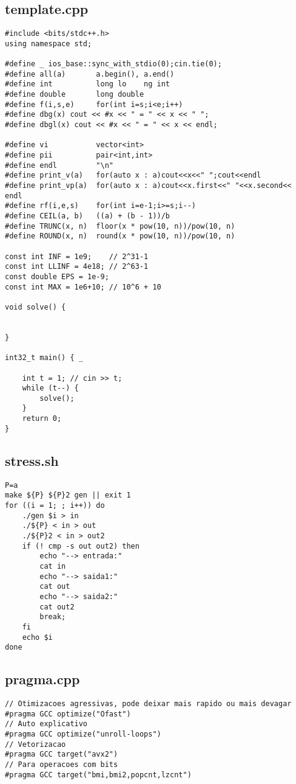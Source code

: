 \documentclass[11pt, a4paper, twoside]{article}
\begin{document}
\subsection{template.cpp}
\begin{lstlisting}
#include <bits/stdc++.h>
using namespace std;

#define _ ios_base::sync_with_stdio(0);cin.tie(0);
#define all(a)       a.begin(), a.end()
#define int          long lo	ng int
#define double       long double
#define f(i,s,e) 	 for(int i=s;i<e;i++)
#define dbg(x) cout << #x << " = " << x << " ";
#define dbgl(x) cout << #x << " = " << x << endl;

#define vi 			 vector<int>
#define pii	         pair<int,int>
#define endl         "\n"
#define print_v(a)   for(auto x : a)cout<<x<<" ";cout<<endl
#define print_vp(a)  for(auto x : a)cout<<x.first<<" "<<x.second<< endl
#define rf(i,e,s) 	 for(int i=e-1;i>=s;i--)
#define CEIL(a, b)   ((a) + (b - 1))/b
#define TRUNC(x, n)  floor(x * pow(10, n))/pow(10, n)
#define ROUND(x, n)  round(x * pow(10, n))/pow(10, n)

const int INF = 1e9;    // 2^31-1
const int LLINF = 4e18; // 2^63-1
const double EPS = 1e-9;
const int MAX = 1e6+10; // 10^6 + 10

void solve() {

	
}

int32_t main() { _
	
	int t = 1; // cin >> t;
	while (t--) {
		solve();
	}
	return 0;
}
\end{lstlisting}

\subsection{stress.sh}
\begin{lstlisting}
P=a
make ${P} ${P}2 gen || exit 1
for ((i = 1; ; i++)) do
	./gen $i > in
	./${P} < in > out
	./${P}2 < in > out2
	if (! cmp -s out out2) then
		echo "--> entrada:"
		cat in
		echo "--> saida1:"
		cat out
		echo "--> saida2:"
		cat out2
		break;
	fi
	echo $i
done
\end{lstlisting}

\subsection{pragma.cpp}
\begin{lstlisting}
// Otimizacoes agressivas, pode deixar mais rapido ou mais devagar
#pragma GCC optimize("Ofast")
// Auto explicativo
#pragma GCC optimize("unroll-loops")
// Vetorizacao
#pragma GCC target("avx2")
// Para operacoes com bits
#pragma GCC target("bmi,bmi2,popcnt,lzcnt")
\end{lstlisting}
\end{document}
